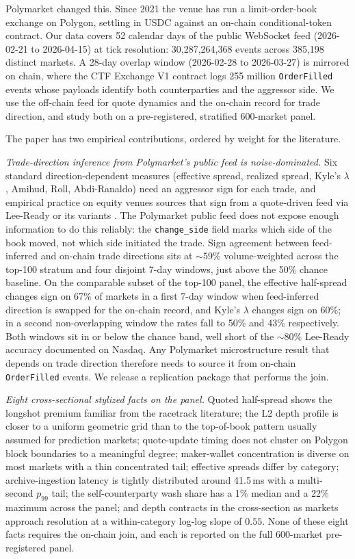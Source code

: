 \documentclass[11pt,a4paper,twocolumn]{article}
\begin{document}
Polymarket changed this. Since 2021 the venue has run a
limit-order-book exchange on Polygon, settling in USDC against an
on-chain conditional-token contract. Our data covers 52 calendar days
of the public WebSocket feed (2026-02-21 to 2026-04-15) at tick
resolution: 30,287,264,368 events across 385,198 distinct markets.
A 28-day overlap window (2026-02-28 to 2026-03-27) is mirrored on
chain, where the CTF Exchange V1 contract logs 255 million
\texttt{OrderFilled} events whose payloads identify both
counterparties and the aggressor side. We use the off-chain feed for
quote dynamics and the on-chain record for trade direction, and study
both on a pre-registered, stratified 600-market panel.

The paper has two empirical contributions, ordered by weight for the
literature.

\textit{Trade-direction inference from Polymarket's public feed is
noise-dominated.} Six standard direction-dependent measures
(effective spread, realized spread, Kyle's $\lambda$, Amihud, Roll,
Abdi-Ranaldo) need an aggressor sign for each trade, and empirical
practice on equity venues sources that sign from a quote-driven feed
via Lee-Ready or its variants
\citep{lee-ready-1991,ellis-michaely-ohara-2000}. The Polymarket
public feed does not expose enough information to do this reliably:
the \texttt{change\_side} field marks which side of the book moved,
not which side initiated the trade. Sign agreement between
feed-inferred and on-chain trade directions sits at $\sim 59\%$
volume-weighted across the top-100 stratum and four disjoint 7-day
windows, just above the 50\% chance baseline. On the comparable
subset of the top-100 panel, the effective half-spread changes sign
on 67\% of markets in a first 7-day window when feed-inferred
direction is swapped for the on-chain record, and Kyle's $\lambda$
changes sign on 60\%; in a second non-overlapping window the rates
fall to 50\% and 43\% respectively. Both windows sit in or below
the chance band, well short of the $\sim 80\%$ Lee-Ready accuracy
documented on Nasdaq. Any Polymarket microstructure result that
depends on trade direction therefore needs to source it from
on-chain \texttt{OrderFilled} events. We release a replication
package that performs the join.

\textit{Eight cross-sectional stylized facts on the panel.} Quoted
half-spread shows the longshot premium familiar from the racetrack
literature; the L2 depth profile is closer to a uniform geometric
grid than to the top-of-book pattern usually assumed for prediction
markets; quote-update timing does not cluster on Polygon block
boundaries to a meaningful degree; maker-wallet concentration is
diverse on most markets with a thin concentrated tail; effective
spreads differ by category; archive-ingestion latency is tightly
distributed around 41.5\,ms with a multi-second $p_{99}$ tail; the
self-counterparty wash share has a 1\% median and a 22\% maximum
across the panel; and depth contracts in the cross-section as
markets approach resolution at a within-category log-log slope of
$0.55$. None of these eight facts requires the on-chain join, and
each is reported on the full 600-market pre-registered panel.
\end{document}
